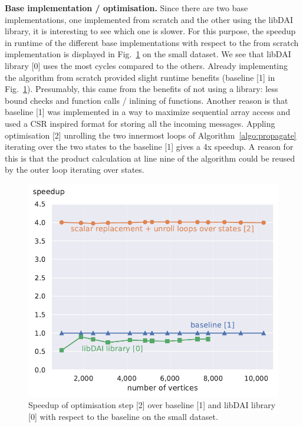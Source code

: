 \documentclass[letterpaper]{article}
\newcommand{\mypar}[1]{{\bf #1.}}
\begin{document}
\mypar{Base implementation / optimisation} Since there are two base implementations, one implemented from scratch and the other using the libDAI library, it is interesting to see which one is slower.
For this purpose, the speedup in runtime of the different base implementations with respect to the from scratch implementation is displayed in Fig.~\ref{libSpeedupSmall} on the small dataset.
We see that libDAI library [0] uses the most cycles compared to the others.
Already implementing the algorithm from scratch provided slight runtime benefits (baseline [1] in Fig.~\ref{libSpeedupSmall}).
Presumably, this came from the benefits of not using a library: less bound checks and function calls / inlining of functions.
Another reason is that baseline [1] was implemented in a way to maximize sequential array access and used a CSR inspired format for storing all the incoming messages.
Appling optimisation [2] unrolling the two innermost loops of Algorithm~\ref{algo:propagate} iterating over the two states to the baseline [1] gives a 4x speedup.
A reason for this is that the product calculation at line nine of the algorithm could be reused by the outer loop iterating over states. \sr{*}
\begin{figure}\centering
	\includegraphics[scale=0.59]{img/speedup[0][1]_small.pdf}
	\caption{Speedup of optimisation step [2] over baseline [1] and libDAI library [0] with respect to the baseline on the small dataset. \label{libSpeedupSmall}}
\end{figure}
\end{document}
